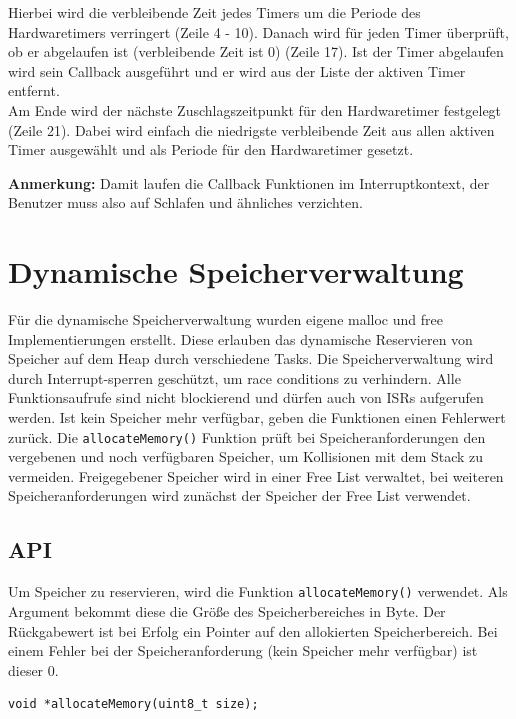 \documentclass[fontsize=12pt, toc=bibliography, notitlepage]{scrreprt}
\begin{document}
Hierbei wird die verbleibende Zeit jedes Timers um die Periode des Hardwaretimers verringert (Zeile 4 - 10). Danach wird für jeden Timer überprüft, ob er abgelaufen ist (verbleibende Zeit ist 0) (Zeile 17). Ist der Timer abgelaufen wird sein Callback ausgeführt und er wird aus der Liste der aktiven Timer entfernt.\\
Am Ende wird der nächste Zuschlagszeitpunkt für den Hardwaretimer festgelegt (Zeile 21). Dabei wird einfach die niedrigste verbleibende Zeit aus allen aktiven Timer ausgewählt und als Periode für den Hardwaretimer gesetzt.

\textbf{Anmerkung:} Damit laufen die Callback Funktionen im Interruptkontext, der Benutzer muss also auf Schlafen und ähnliches verzichten.

\chapter{Dynamische Speicherverwaltung}
\label{chap:dynamische-speicherverwaltung}
Für die dynamische Speicherverwaltung wurden eigene malloc und free Implementierungen erstellt. Diese erlauben das dynamische Reservieren von Speicher auf dem Heap durch verschiedene Tasks. Die Speicherverwaltung wird durch Interrupt-sperren geschützt, um race conditions zu verhindern. Alle Funktionsaufrufe sind nicht blockierend und dürfen auch von ISRs aufgerufen werden. Ist kein Speicher mehr verfügbar, geben die Funktionen einen Fehlerwert zurück. Die \lstinline$allocateMemory()$ Funktion prüft bei Speicheranforderungen den vergebenen und noch verfügbaren Speicher, um Kollisionen mit dem Stack zu vermeiden. Freigegebener Speicher wird in einer Free List verwaltet, bei weiteren Speicheranforderungen wird zunächst der Speicher der Free List verwendet.

\section{API}
\label{subsec:mem-api}
Um Speicher zu reservieren, wird die Funktion \lstinline$allocateMemory()$ verwendet. Als Argument bekommt diese die Größe des Speicherbereiches in Byte. Der Rückgabewert ist bei Erfolg ein Pointer auf den allokierten Speicherbereich. Bei einem Fehler bei der Speicheranforderung (kein Speicher mehr verfügbar) ist dieser 0.

\begin{lstlisting}[title=memory.h]
void *allocateMemory(uint8_t size);
\end{lstlisting}
\end{document}
